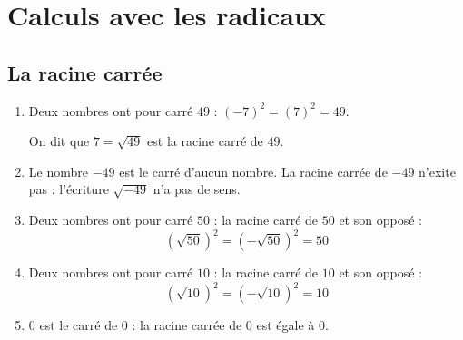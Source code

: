 \documentclass[main.tex]{subfiles}
\begin{document}
 
%	 
\cleardoublepage
{}  
\pagestyle{scrheadings} %
\onehalfspacing 
\setcounter{chapter}{7}


\chapter{Calculs avec les radicaux}


\section{La racine carrée} 
\begin{example}\hfill 
\begin{enumerate}[label=\arabic*),leftmargin=*]
	\item Deux nombres ont pour carré $49$ : $(-7)^2=(7)^2=49$. 
	
On dit que $7=\sqrt{49}$ est la racine carré de $49$.
\item Le nombre $-49$ est le carré d'aucun nombre. La racine carrée de $-49$ n'exite pas : l'écriture $\sqrt{-49}$ n'a pas de sens. 
\item Deux nombres ont pour carré $50$ : la racine carré de $50$ et son opposé :
\setlength{\abovedisplayskip}{3pt}
\setlength{\belowdisplayskip}{3pt} 
\[	
(\sqrt{50})^2=(-\sqrt{50})^2=50
\] 
\item Deux nombres ont pour carré $10$ : la racine carré de $10$ et son opposé :
\setlength{\abovedisplayskip}{3pt}
\setlength{\belowdisplayskip}{3pt} 
\[	
(\sqrt{10})^2=(-\sqrt{10})^2=10
\] 
\item $0$ est le carré de $0$ : la racine carrée de $0$ est égale à $0$.
\end{enumerate} 
	\end{example}
\end{document}
